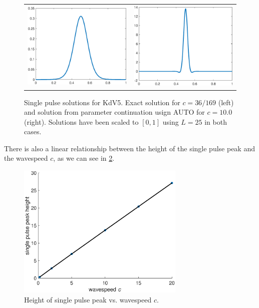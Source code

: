 \documentclass[thesis.tex]{subfiles}
\begin{document}
\begin{figure}[H]
\begin{center}
\begin{tabular}{cc}
\includegraphics[width=8cm]{images/kdv5numerics/singleexact.eps} &
\includegraphics[width=8cm]{images/kdv5numerics/single10}
\end{tabular}
\caption{Single pulse solutions for KdV5. Exact solution for $c = 36/169$ (left) and solution from parameter continuation usign AUTO for $c = 10.0$ (right). Solutions have been scaled to $[0, 1]$ using $L = 25$ in both cases.}
\label{fig:KdV5singlepulse}
\end{center}
\end{figure}

There is also a linear relationship between the height of the single pulse peak and the wavespeed $c$, as we can see in \cref{fig:KdV5peakht}.

\begin{figure}[H]
\begin{center}
\includegraphics[width=8cm]{images/kdv5numerics/peakheightvsc}
\caption{Height of single pulse peak vs. wavespeed $c$.}
\label{fig:KdV5peakht}
\end{center}
\end{figure}
\end{document}
